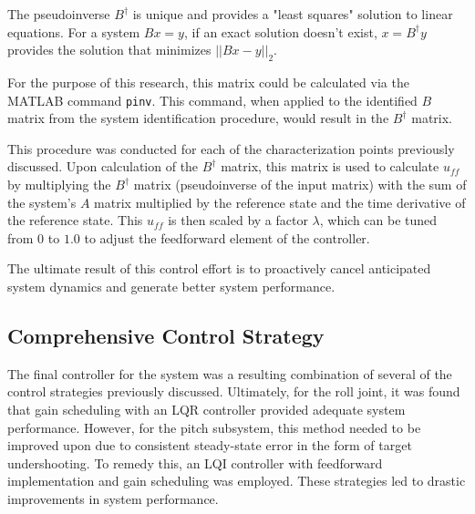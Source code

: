 The pseudoinverse $B^\dagger$ is unique and provides a "least squares" solution to linear equations. For a system $Bx = y$, if an exact solution doesn't exist, $x = B^\dagger y$ provides the solution that minimizes $||Bx - y||_2$.

For the purpose of this research, this matrix could be calculated via the MATLAB command \texttt{pinv}. This command, when applied to the identified $B$ matrix from the system identification procedure, would result in the $B^\dagger$ matrix.


This procedure was conducted for each of the characterization points previously discussed. Upon calculation of the $B^\dagger$ matrix, this matrix is used to calculate $u_{ff}$ by multiplying the $B^\dagger$ matrix (pseudoinverse of the input matrix) with the sum of the system's $A$ matrix multiplied by the reference state and the time derivative of the reference state. This $u_{ff}$ is then scaled by a factor $\lambda$, which can be tuned from $0$ to $1.0$ to adjust the feedforward element of the controller.

The ultimate result of this control effort is to proactively cancel anticipated system dynamics and generate better system performance.

\subsection{Comprehensive Control Strategy}


The final controller for the system was a resulting combination of several of the control strategies previously discussed. Ultimately, for the roll joint, it was found that gain scheduling with an LQR controller provided adequate system performance. However, for the pitch subsystem, this method needed to be improved upon due to consistent steady-state error in the form of target undershooting. To remedy this, an LQI controller with feedforward implementation and gain scheduling was employed. These strategies led to drastic improvements in system performance.

